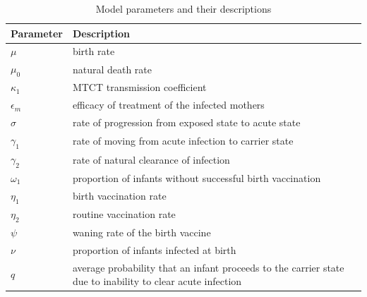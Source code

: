 		\vspace{1cm}
\begin{table}[t]
	\centering
		\begin{tabular}{ |p{1.57cm}|p{12cm}| }
			\hline
			Parameter& Description \\
			\hline
			$	\mu		$    					& 				birth rate    \\
			$	\mu_0 $					     &  	 natural death rate   \\
			$\kappa_1$ 				      & 	MTCT transmission coefficient\\
			$\epsilon_m$ 			   & 	efficacy of treatment of the infected mothers\\
			$\sigma$ 						 & 	rate of progression from exposed state to acute state\\
			$\gamma_1$				   & 	rate of moving from acute infection to carrier state\\
			$\gamma_2$ 				   & 	rate of natural clearance of infection\\
			$\omega_1$					& 	proportion of infants without successful birth vaccination\\
			$\eta_1$ 						 & 	birth vaccination rate\\
			$\eta_2$ 						 &	 routine vaccination rate\\
			$\psi$								 &	 waning rate of the birth vaccine\\
			$\nu$ 								 & 	proportion of infants infected at birth\\
			$q$ 								   & 	average probability that an infant proceeds to the carrier state due to inability to clear acute infection\\
			\hline
		\end{tabular}
		\caption{Model parameters and their descriptions}
		\label{table:1}
\end{table}
